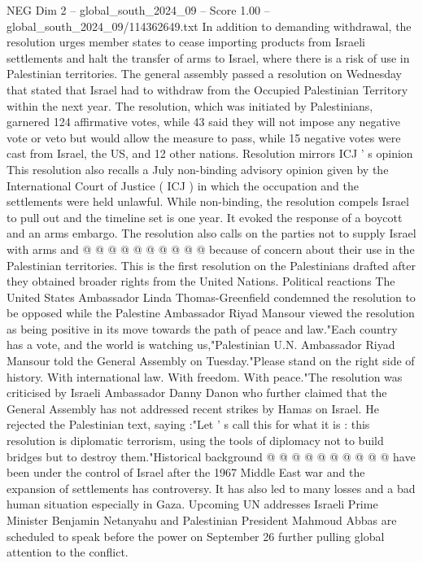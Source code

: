 \begin{textsample}{NEG Dim 2 – global\_south\_2024\_09 – Score 1.00 – global\_south\_2024\_09/114362649.txt}  \label{ex:f2_neg_258}
In addition to demanding withdrawal, the resolution urges member states to cease importing products from Israeli settlements and halt the transfer of arms to Israel, where there is a risk of use in Palestinian territories.
The general assembly passed a resolution on Wednesday that stated that Israel had to withdraw from the Occupied Palestinian Territory within the next year.
The resolution, which was initiated by Palestinians, garnered 124 affirmative votes, while 43 said they will not impose any negative vote or veto but would allow the measure to pass, while 15 negative votes were cast from Israel, the US, and 12 other nations.
Resolution mirrors ICJ ' s opinion This resolution also recalls a July non-binding advisory opinion given by the International Court of Justice ( ICJ ) in which the occupation and the settlements were held unlawful.
While non-binding, the resolution compels Israel to pull out and the timeline set is one year.
It evoked the response of a boycott and an arms embargo.
The resolution also calls on the parties not to supply Israel with arms and @ @ @ @ @ @ @ @ @ @ because of concern about their use in the Palestinian territories.
This is the first resolution on the Palestinians drafted after they obtained broader rights from the United Nations.
Political reactions The United States Ambassador Linda Thomas-Greenfield condemned the resolution to be opposed while the Palestine Ambassador Riyad Mansour viewed the resolution as being positive in its move towards the path of peace and law."Each country has a vote, and the world is watching us,"Palestinian U.N.
Ambassador Riyad Mansour told the General Assembly on Tuesday."Please stand on the right side of history.
With international law.
With freedom.
With peace."The resolution was criticised by Israeli Ambassador Danny Danon who further claimed that the General Assembly has not addressed recent strikes by Hamas on Israel.
He rejected the Palestinian text, saying :"Let ' s call this for what it is : this resolution is diplomatic terrorism, using the tools of diplomacy not to build bridges but to destroy them."Historical background @ @ @ @ @ @ @ @ @ @ have been under the control of Israel after the 1967 Middle East war and the expansion of settlements has controversy.
It has also led to many losses and a bad human situation especially in Gaza.
Upcoming UN addresses Israeli Prime Minister Benjamin Netanyahu and Palestinian President Mahmoud Abbas are scheduled to speak before the power on September 26 further pulling global attention to the conflict.

\end{textsample}
